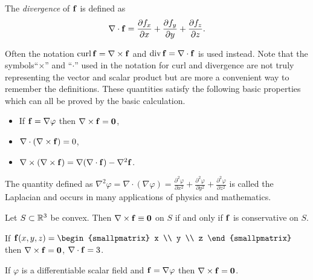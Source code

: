 \begin{definition}[divergence]%
    \label{def:div}
    The \emph{divergence} of \(\mathbf{f}\) is defined as
    \[
        \nabla \cdot \mathbf{f} = \frac{\partial f_x}{\partial x} +  \frac{\partial f_y}{\partial y} +  \frac{\partial f_z}{\partial z}.
    \]
\end{definition}

Often the notation
\(\operatorname{curl} \mathbf{f} = \nabla \times \mathbf{f}\)
and \(\operatorname{div} \mathbf{f} = \nabla \cdot \mathbf{f}\) is used instead.
Note that the symbols``\(\times\)'' and ``\(\cdot\)'' used in the notation for curl and divergence are not truly representing the vector and scalar product but are more a convenient way to remember the definitions.
These quantities satisfy the following basic properties which can all be proved by the basic calculation.
\begin{itemize}
    \item If \(\mathbf{f} = \nabla \varphi\) then \( \nabla \times \mathbf{f} = \mathbf{0} \),
    \item \(\nabla \cdot (\nabla \times \mathbf{f}) = 0\),
    \item \(\nabla \times (\nabla \times \mathbf{f}) = \nabla(\nabla\cdot \mathbf{f}) - \nabla^2 \mathbf{f}\).
\end{itemize}
The quantity defined as
\(\nabla^2 \varphi = \nabla \cdot (\nabla \varphi) =
\frac{\partial^2 \varphi}{\partial x^2} +
\frac{\partial^2 \varphi}{\partial y^2} +
\frac{\partial^2 \varphi}{\partial z^2}\)
is called the Laplacian and occurs in many applications of physics and mathematics.

\begin{theorem}
    Let \(S\subset \mathbb{R}^3\) be convex. Then \(\nabla \times \mathbf{f} \equiv \mathbf{0}\) on \(S\) if and only if \(\mathbf{f}\) is conservative on \(S\).
\end{theorem}


\begin{example*}
    If \(\ff(x,y,z) = \begin{smallpmatrix}
        x \\ y \\ z
    \end{smallpmatrix}\)
    then
    \(\nabla \times \mathbf{f} = \mathbf{0}\),
    \(\nabla \cdot \mathbf{f} = 3\).
\end{example*}

\begin{example*}
    If \(\varphi\) is a differentiable scalar field and \(\mathbf{f} = \nabla \varphi\)
    then
    \(\nabla \times \mathbf{f} = \mathbf{0}\).
\end{example*}


